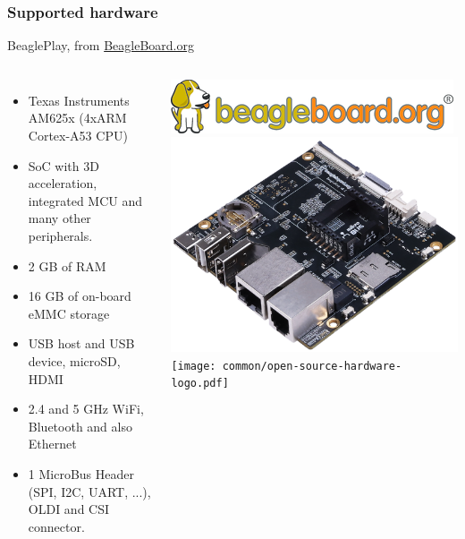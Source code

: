\begin{frame}
\frametitle{Supported hardware}
  BeaglePlay, from
\href{https://beagleboard.org}{BeagleBoard.org}
  \begin{columns}
    \footnotesize
    \begin{itemize}
      \item Texas Instruments AM625x (4xARM Cortex-A53 CPU)
      \item SoC with 3D acceleration, integrated MCU and many other peripherals.
      \item 2 GB of RAM
      \item 16 GB of on-board eMMC storage
      \item USB host and USB device, microSD, HDMI
      \item 2.4 and 5 GHz WiFi, Bluetooth and also Ethernet
      \item 1 MicroBus Header (SPI, I2C, UART, ...), OLDI and CSI connector.
    \end{itemize}
    \begin{center}
      \includegraphics[width=\textwidth]{slides/beagleplay-board/beagle_logo_326x60.png}\\
      \includegraphics[width=\textwidth]{slides/beagleplay-board/beagleplay.png}\\
      \texttt{[image: common/open-source-hardware-logo.pdf]}
    \end{center}
  \end{columns}
\end{frame}

